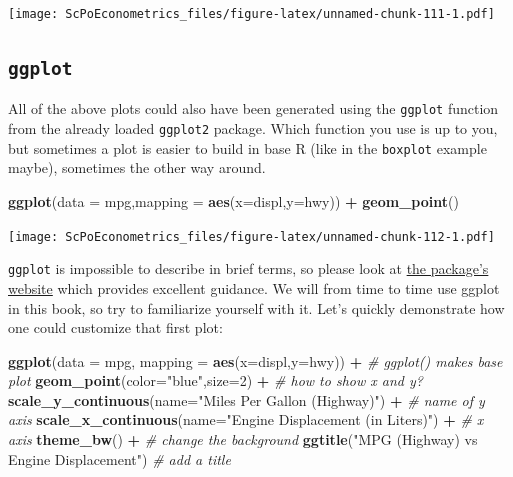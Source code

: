 \documentclass[]{book}
\newenvironment{Shaded}{\begin{snugshade}}{\end{snugshade}}
\newcommand{\KeywordTok}[1]{\textcolor[rgb]{0.13,0.29,0.53}{\textbf{#1}}}
\newcommand{\DataTypeTok}[1]{\textcolor[rgb]{0.13,0.29,0.53}{#1}}
\newcommand{\DecValTok}[1]{\textcolor[rgb]{0.00,0.00,0.81}{#1}}
\newcommand{\StringTok}[1]{\textcolor[rgb]{0.31,0.60,0.02}{#1}}
\newcommand{\CommentTok}[1]{\textcolor[rgb]{0.56,0.35,0.01}{\textit{#1}}}
\newcommand{\OperatorTok}[1]{\textcolor[rgb]{0.81,0.36,0.00}{\textbf{#1}}}
\newcommand{\NormalTok}[1]{#1}
\theoremstyle{definition}
\theoremstyle{definition}
\theoremstyle{definition}
\theoremstyle{remark}
\begin{document}
\texttt{[image: ScPoEconometrics\_files/figure-latex/unnamed-chunk-111-1.pdf]}

\subsection{\texorpdfstring{\texttt{ggplot}}{ggplot}}\label{ggplot}

All of the above plots could also have been generated using the
\texttt{ggplot} function from the already loaded \texttt{ggplot2}
package. Which function you use is up to you, but sometimes a plot is
easier to build in base R (like in the \texttt{boxplot} example maybe),
sometimes the other way around.

\begin{Shaded}
\begin{Highlighting}[]
\KeywordTok{ggplot}\NormalTok{(}\DataTypeTok{data =}\NormalTok{ mpg,}\DataTypeTok{mapping =} \KeywordTok{aes}\NormalTok{(}\DataTypeTok{x=}\NormalTok{displ,}\DataTypeTok{y=}\NormalTok{hwy)) }\OperatorTok{+}\StringTok{ }\KeywordTok{geom_point}\NormalTok{()}
\end{Highlighting}
\end{Shaded}

\texttt{[image: ScPoEconometrics\_files/figure-latex/unnamed-chunk-112-1.pdf]}

\texttt{ggplot} is impossible to describe in brief terms, so please look
at \href{http://ggplot2.tidyverse.org}{the package's website} which
provides excellent guidance. We will from time to time use ggplot in
this book, so try to familiarize yourself with it. Let's quickly
demonstrate how one could customize that first plot:

\begin{Shaded}
\begin{Highlighting}[]
\KeywordTok{ggplot}\NormalTok{(}\DataTypeTok{data =}\NormalTok{ mpg, }\DataTypeTok{mapping =} \KeywordTok{aes}\NormalTok{(}\DataTypeTok{x=}\NormalTok{displ,}\DataTypeTok{y=}\NormalTok{hwy)) }\OperatorTok{+}\StringTok{   }\CommentTok{# ggplot() makes base plot}
\StringTok{  }\KeywordTok{geom_point}\NormalTok{(}\DataTypeTok{color=}\StringTok{"blue"}\NormalTok{,}\DataTypeTok{size=}\DecValTok{2}\NormalTok{) }\OperatorTok{+}\StringTok{     }\CommentTok{# how to show x and y?}
\StringTok{  }\KeywordTok{scale_y_continuous}\NormalTok{(}\DataTypeTok{name=}\StringTok{"Miles Per Gallon (Highway)"}\NormalTok{) }\OperatorTok{+}\StringTok{  }\CommentTok{# name of y axis}
\StringTok{  }\KeywordTok{scale_x_continuous}\NormalTok{(}\DataTypeTok{name=}\StringTok{"Engine Displacement (in Liters)"}\NormalTok{) }\OperatorTok{+}\StringTok{ }\CommentTok{# x axis}
\StringTok{  }\KeywordTok{theme_bw}\NormalTok{() }\OperatorTok{+}\StringTok{    }\CommentTok{# change the background}
\StringTok{  }\KeywordTok{ggtitle}\NormalTok{(}\StringTok{"MPG (Highway) vs Engine Displacement"}\NormalTok{)   }\CommentTok{# add a title}
\end{Highlighting}
\end{Shaded}
\end{document}
